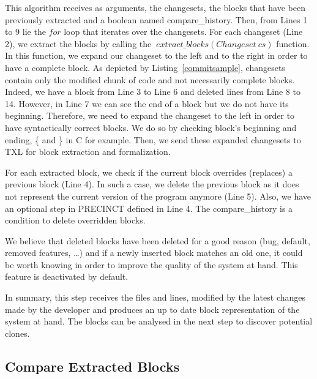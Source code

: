 \documentclass[conference]{IEEEtran}
\begin{document}
This algorithm receives as arguments, the changesets, the blocks that have been previously extracted and a boolean named compare\_history.
Then, from Lines 1 to 9 lie the $for$ loop that iterates over the changesets. For each changeset (Line 2), we extract the blocks by calling the $~extract\_blocks(Changeset~cs)$ function.
In this function, we expand our changeset to the left and to the right in order to have a complete block.
As depicted by Listing~\ref{commitsample}, changesets contain only the modified chunk of code and not necessarily complete blocks. Indeed, we have a block from Line 3 to Line 6 and deleted lines from Line 8 to 14.
However, in Line 7 we can see the end of a block but we do not have its beginning. Therefore, we need to expand the changeset to the left in order to have syntactically correct blocks.
We do so by checking block's beginning and ending, \{ and \} in C for example.
Then, we send these expanded changesets to TXL for block extraction and formalization.

\noindent\begin{minipage}{0.90\linewidth}

  

\end{minipage}


For each extracted block, we check if the current block overrides (replaces) a previous block (Line 4).
In such a case, we delete the previous block as it does not represent the current version of the program anymore (Line 5).
Also, we have an optional step in PRECINCT defined in Line 4. The compare\_history is a condition to delete overridden blocks.

We believe that deleted blocks have been deleted for a good reason (bug, default, removed features, \ldots) and if a newly inserted block matches an old one, it could be worth knowing in order to improve the quality of the system at hand.
This feature is deactivated by default.

In summary, this step receives the files and lines, modified by the latest changes made by the developer and produces an up to date block representation of the system at hand. The blocks can be analysed in the next step to discover potential clones.

\subsection{Compare Extracted Blocks}
\label{sub:Compare Extracted Blocks}
\end{document}
